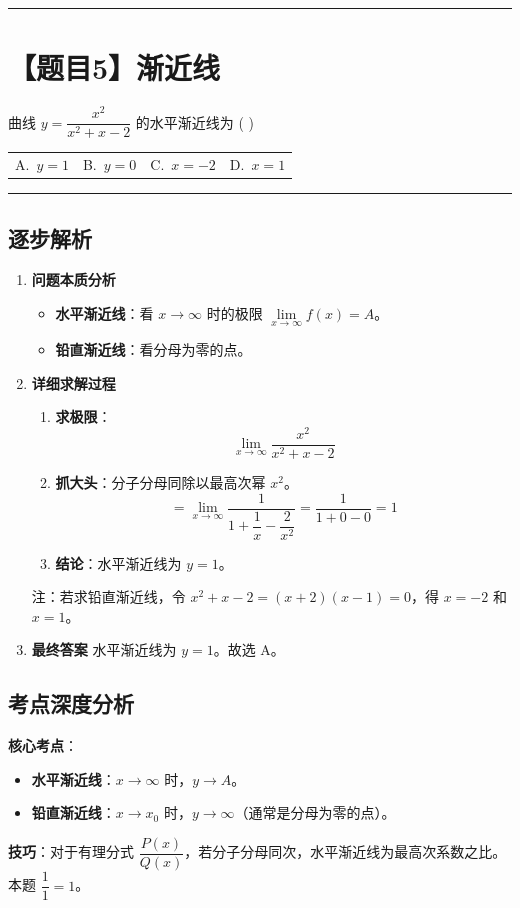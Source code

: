 \documentclass[UTF8,10pt]{ctexart}
\makeatletter
\newenvironment{redenv}{\color{red}}{}
\newenvironment{detailedanalysis}{%
    \color{red}
    \begin{enumerate}[label=\textbf{第\arabic*步：}, leftmargin=*, align=left, itemsep=0pt, parsep=0pt, topsep=0pt, partopsep=0pt]
}{%
    \end{enumerate}
}
\newenvironment{conceptbox}{%
    \begin{tcolorbox}[colback=red!5, colframe=red!50!black, title=概念解析, fonttitle=\bfseries, top=2pt, bottom=2pt, left=2pt, right=2pt]
}{%
    \end{tcolorbox}
}
\newcommand{\problemrule}{\par\filbreak\noindent\rule{\textwidth}{1.5pt}\vspace{-0.5em}}
\newcommand{\analysisrule}{\noindent\rule{\textwidth}{0.8pt}\vspace{-0.5em}}
\newcommand{\fourchoices}[4]{
    \par\noindent
    \begin{tabular*}{\linewidth}{@{\extracolsep{\fill}}llll}
        A.~#1 & B.~#2 & C.~#3 & D.~#4
    \end{tabular*}
}
\makeatother
\begin{document}
\problemrule
\section*{【题目5】渐近线}
曲线 $y = \dfrac{x^2}{x^2+x-2}$ 的水平渐近线为 ( \quad )
\fourchoices{$y=1$}{$y=0$}{$x=-2$}{$x=1$}

\begin{redenv}
\analysisrule
\subsection*{逐步解析}

\begin{detailedanalysis}
\item \textbf{问题本质分析}
\begin{itemize}
    \item \textbf{水平渐近线}：看 $x \to \infty$ 时的极限 $\lim\limits_{x\to \infty} f(x) = A$。
    \item \textbf{铅直渐近线}：看分母为零的点。
\end{itemize}

\item \textbf{详细求解过程}
\begin{enumerate}[label=(\alph*)]
    \item \textbf{求极限}：
    \[ \lim\limits_{x \to \infty} \dfrac{x^2}{x^2+x-2} \]
    \item \textbf{抓大头}：分子分母同除以最高次幂 $x^2$。
    \[ = \lim\limits_{x \to \infty} \dfrac{1}{1 + \dfrac{1}{x} - \dfrac{2}{x^2}} = \dfrac{1}{1+0-0} = 1 \]
    \item \textbf{结论}：水平渐近线为 $y=1$。
\end{enumerate}
注：若求铅直渐近线，令 $x^2+x-2=(x+2)(x-1)=0$，得 $x=-2$ 和 $x=1$。

\item \textbf{最终答案}
水平渐近线为 $y=1$。故选 A。
\end{detailedanalysis}

\subsection*{考点深度分析}
\begin{conceptbox}
\textbf{核心考点}：
\begin{itemize}
    \item \textbf{水平渐近线}：$x \to \infty$ 时，$y \to A$。
    \item \textbf{铅直渐近线}：$x \to x_0$ 时，$y \to \infty$（通常是分母为零的点）。
\end{itemize}
\textbf{技巧}：对于有理分式 $\dfrac{P(x)}{Q(x)}$，若分子分母同次，水平渐近线为最高次系数之比。本题 $\dfrac{1}{1}=1$。
\end{conceptbox}
\end{redenv}
\end{document}
